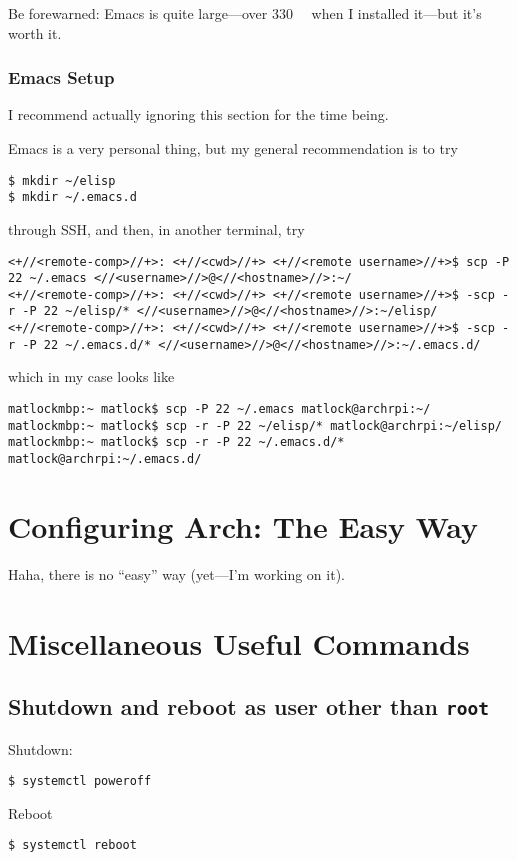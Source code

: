 \documentclass[12pt,letterpaper]{article}
\begin{document}
Be forewarned: Emacs is quite large---over \SI{330}{\mebi\byte} when I installed it---but it's worth it.

\subsubsection{Emacs Setup\label{emacs-setup}}
I recommend actually ignoring this section for the time being.

Emacs is a very personal thing, but my general recommendation is to try
\begin{lstlisting}
$ mkdir ~/elisp
$ mkdir ~/.emacs.d
\end{lstlisting}
through SSH, and then, in another terminal, try
\begin{lstlisting}[basicstyle=\ttfamily\footnotesize]
<+//<remote-comp>//+>: <+//<cwd>//+> <+//<remote username>//+>$ scp -P 22 ~/.emacs <//<username>//>@<//<hostname>//>:~/
<+//<remote-comp>//+>: <+//<cwd>//+> <+//<remote username>//+>$ -scp -r -P 22 ~/elisp/* <//<username>//>@<//<hostname>//>:~/elisp/
<+//<remote-comp>//+>: <+//<cwd>//+> <+//<remote username>//+>$ -scp -r -P 22 ~/.emacs.d/* <//<username>//>@<//<hostname>//>:~/.emacs.d/
\end{lstlisting}
which in my case looks like
\begin{lstlisting}[basicstyle=\ttfamily\footnotesize]
matlockmbp:~ matlock$ scp -P 22 ~/.emacs matlock@archrpi:~/
matlockmbp:~ matlock$ scp -r -P 22 ~/elisp/* matlock@archrpi:~/elisp/
matlockmbp:~ matlock$ scp -r -P 22 ~/.emacs.d/* matlock@archrpi:~/.emacs.d/
\end{lstlisting}

\section{Configuring Arch: The Easy Way}
Haha, there is no ``easy'' way (yet---I'm working on it).

\section{Miscellaneous Useful Commands}

\subsection{Shutdown and reboot as user other than \lstinline{root}}
Shutdown:
\begin{lstlisting}
$ systemctl poweroff
\end{lstlisting}

Reboot
\begin{lstlisting}
$ systemctl reboot
\end{lstlisting}
\end{document}
